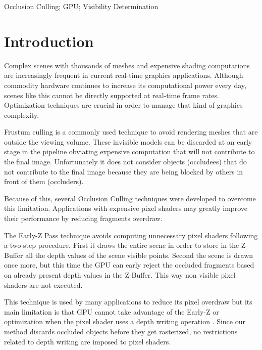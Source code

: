 \documentclass[10pt, conference]{IEEEtran}
\begin{document}
\begin{IEEEkeywords}
Occlusion Culling; GPU; Visibility Determination

\end{IEEEkeywords}


\IEEEpeerreviewmaketitle




\section{Introduction}
%
Complex scenes with thousands of meshes and expensive shading computations are increasingly frequent in current real-time graphics applications. 
Although commodity hardware continues to increase its computational power every day, scenes like this cannot be directly supported at real-time frame rates. 
Optimization techniques are crucial in order to manage that kind of graphics complexity.\

Frustum culling is a commonly used technique to avoid rendering meshes that are outside the viewing volume. 
These invisible models can be discarded at an early stage in the pipeline obviating expensive computation that will not contribute to the final image. 
Unfortunately it does not consider objects (occludees) that do not contribute to the final image because they are being blocked by others in front of them (occluders).\

Because of this, several Occlusion Culling techniques were developed to overcome this limitation. 
Applications with expensive pixel shaders may greatly improve their performance by reducing fragments overdraw.\

The Early-Z Pass \cite{z_pre_pass} technique avoids computing unnecessary pixel shaders following a two step procedure. 
First it draws the entire scene in order to store in the Z-Buffer all the depth values of the scene visible points. 
Second the scene is drawn once more, but this time the GPU can early reject the occluded fragments based on already present depth values in the Z-Buffer. 
This way non visible pixel shaders are not executed.\

This technique is used by many applications to reduce its pixel overdraw but its main limitation is that GPU cannot take advantage of the Early-Z \cite{early_z} or 
\cite{HyperZ} optimization when the pixel shader uses a depth writing operation \cite{z_correct_bump_1} \cite{z_correct_bump_2}. 
Since our method discards occluded objects before they get rasterized, no restrictions related to depth writing are imposed to pixel shaders.\
\end{document}
